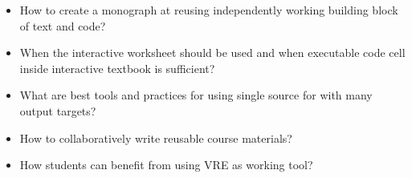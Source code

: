 \begin{workpackage}[id=dissem,wphases=18-48!.5,
  title=Dissemination,
  SARM=1,
  USORM=7,
  USHRM=8,
  USRM=24
]
\begin{tasklist}
\begin{task}[title=Demonstrator: interactive books,
id=ibook]
\begin{itemize}
\item How to create a monograph at reusing independently working   building block of text and code?
\item When the interactive worksheet should be used and when  executable code cell inside interactive textbook is sufficient?
\item What are best tools and practices for using single source for with many output targets? 
\item How to collaboratively write reusable course materials?
\item How students can benefit from  using VRE as working tool?
\end{itemize}




\end{task}

\end{tasklist}




\end{workpackage}
